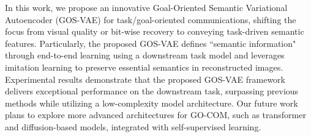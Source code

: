 
%


In this work, we propose an innovative Goal-Oriented Semantic Variational Autoencoder (GOS-VAE) for task/goal-oriented communications, shifting the focus from visual quality or bit-wise recovery to conveying task-driven semantic features. Particularly, the proposed GOS-VAE defines ``semantic information" through end-to-end learning using a downstream task model and leverages imitation learning to preserve essential semantics in reconstructed images. Experimental results demonstrate that the proposed GOS-VAE framework delivers exceptional performance on the downstream task, surpassing previous methods while utilizing a low-complexity model architecture. Our future work plans to explore more advanced architectures for GO-COM, such as transformer and diffusion-based models, integrated with self-supervised learning.

%